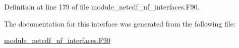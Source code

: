 Definition at line 179 of file module\+\_\+netcdf\+\_\+nf\+\_\+interfaces.\+F90.



The documentation for this interface was generated from the following file\+:\begin{DoxyCompactItemize}
\item 
\hyperlink{module__netcdf__nf__interfaces_8F90}{module\+\_\+netcdf\+\_\+nf\+\_\+interfaces.\+F90}\end{DoxyCompactItemize}
